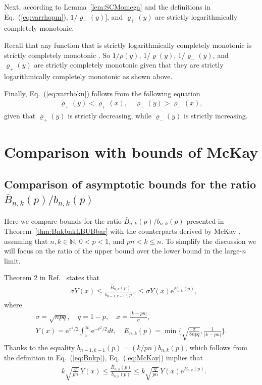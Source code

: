 \documentclass[aop]{imsart}
\theoremstyle{plain}
\theoremstyle{remark}
\newcommand{\rme}{\mathrm{e}}
\newcommand{\bbN}{\mathbb{N}}
\newcommand{\1}{\operatorname{\uppercase\expandafter{\romannumeral1}}}
\newcommand{\2}{\operatorname{\uppercase\expandafter{\romannumeral2}}}
\newcommand{\3}{\operatorname{\uppercase\expandafter{\romannumeral3}}}
\newcommand{\4}{\operatorname{\uppercase\expandafter{\romannumeral4}}}
\newcommand{\5}{\operatorname{\uppercase\expandafter{\romannumeral5}}}
\newcommand{\6}{\operatorname{\uppercase\expandafter{\romannumeral6}}}
\newcommand{\7}{\operatorname{\uppercase\expandafter{\romannumeral7}}}
\newcommand{\8}{\operatorname{\uppercase\expandafter{\romannumeral8}}}
\newcommand{\9}{\operatorname{\uppercase\expandafter{\romannumeral9}}}
\newcommand{\eref}[1]{Eq.~\textup{(\ref{#1})}}
\newcommand{\thref}[1]{Theorem~\ref{#1}}
\newcommand{\lref}[1]{Lemma~\ref{#1}}
\newcommand{\rcite}[1]{Ref.~\cite{#1}}
\begin{document}
\begin{appendix}
	
	Next, according to \lref{lem:SCMomega} and the definitions in \eref{eq:varrhopm}, $1/ \varrho_-(y)]$, and $\varrho_+(y)$ are strictly logarithmically completely monotonic. 
	
	Recall that any function that is strictly logarithmically completely monotonic  is strictly completely monotonic \cite{QiC04}. So $1/\rho(y)$,  $1/\varrho(y)$, $1/\varrho_-(y)$, and $ \varrho_+(y)$	are  strictly completely monotonic given that they are  strictly logarithmically completely monotonic as shown above. 
	
	Finally, \eref{eq:varrhokn} follows from the following equation
	\begin{align}
	\varrho_+(y)<\varrho_+(x),\quad \varrho_-(y)>\varrho_-(x),
	\end{align}
	given that $\varrho_+(y)$ is strictly decreasing, while $\varrho_-(y)$ is strictly increasing. 	

 
\section{\label{app:comparison}Comparison with bounds of McKay \cite{McKa89}}\label{APE}



\subsection{Comparison of asymptotic bounds for the ratio $\bar{B}_{n,k}(p)/b_{n,k}(p)$}
Here we compare bounds for the ratio $\bar{B}_{n,k}(p)/b_{n,k}(p)$ presented in  \thref{thm:BnkbnkLBUBbar} with the counterparts derived by McKay \cite{McKa89}, assuming that $n,k\in \bbN$, $0<p<1$, and $pn<k\leq n$. To simplify the discussion we will focus on the ratio of the upper bound over the lower bound in the large-$n$ limit.
 
Theorem 2 in  \rcite{McKa89} states that 
\begin{align}
&\sigma Y(x)
\le \frac{\bar{B}_{n,k}(p)}{b_{n-1,k-1}(p)} \le \sigma Y(x)
\rme^{E_{n,k}(p)},\label{eq:McKay}
\end{align}	
where 
\begin{gather}
\sigma=\sqrt{npq},\quad q=1-p, \quad x=\frac{|k-pn|}{\sigma},\\ Y(x)=\rme^{x^2/2}\int_x^\infty \rme^{-t^2/2}dt, \quad E_{n,k}(p)=\min\biggl\{\sqrt{\frac{\pi}{8npq}},
\frac{1}{|k-pn|}\biggr\}. 
\end{gather}
Thanks to  the equality $b_{n-1,k-1}(p)=(k/pn)b_{n,k}(p)$, which follows from the definition in \eref{eq:Bnkp}, \eref{eq:McKay} implies that
\begin{align}
&k\sqrt{\frac{q}{pn}}\,  Y(x)
\le \frac{\bar{B}_{n,k}(p)}{b_{n,k}(p)} \le k\sqrt{\frac{q}{pn}}\, Y(x) \rme^{E_{n,k}(p)}.\label{eq:McKay2}
\end{align}	



\end{appendix}
\end{document}
